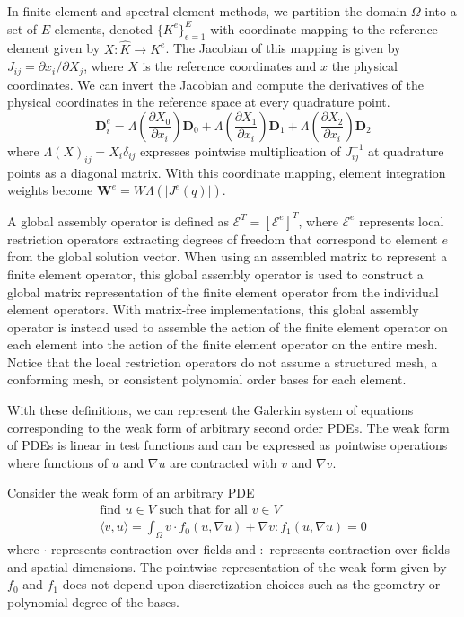 In finite element and spectral element methods, we partition the domain $\Omega$ into a set of $E$ elements, denoted $\lbrace K^e \rbrace_{e = 1}^E$ with coordinate mapping to the reference element given by $X : \hat{K} \rightarrow K^e$.
The Jacobian of this mapping is given by $J_{i j} = \partial x_i / \partial X_j$, where $X$ is the reference coordinates and $x$ the physical coordinates.
We can invert the Jacobian and compute the derivatives of the physical coordinates in the reference space at every quadrature point.
\begin{equation}
\mathbf{D}_i^e = \Lambda \left( \frac{\partial X_0}{\partial x_i} \right) \mathbf{D}_0 + \Lambda \left( \frac{\partial X_1}{\partial x_i} \right) \mathbf{D}_1 + \Lambda \left( \frac{\partial X_2}{\partial x_i} \right) \mathbf{D}_2
\end{equation}
where $\Lambda \left( X \right)_{i j} = X_i \delta_{i j}$ expresses pointwise multiplication of $J_{i j}^{-1}$ at quadrature points as a diagonal matrix.
With this coordinate mapping, element integration weights become $\mathbf{W}^e = W \Lambda \left( \lvert J^e \left( q \right) \rvert \right)$.

A global assembly operator is defined as $\mathcal{E}^T = \left[ \mathcal{E}^e \right]^T$, where $\mathcal{E}^e$ represents local restriction operators extracting degrees of freedom that correspond to element $e$ from the global solution vector.
When using an assembled matrix to represent a finite element operator, this global assembly operator is used to construct a global matrix representation of the finite element operator from the individual element operators.
With matrix-free implementations, this global assembly operator is instead used to assemble the action of the finite element operator on each element into the action of the finite element operator on the entire mesh.
Notice that the local restriction operators do not assume a structured mesh, a conforming mesh, or consistent polynomial order bases for each element.

With these definitions, we can represent the Galerkin system of equations corresponding to the weak form of arbitrary second order PDEs.
The weak form of PDEs is linear in test functions and can be expressed as pointwise operations where functions of $u$ and $\nabla u$ are contracted with $v$ and $\nabla v$.

Consider the weak form of an arbitrary PDE
\begin{equation}
\begin{array}{c}
\text{find } u \in V \text{ such that for all } v \in V\\
\langle v, u \rangle = \int_{\Omega} v \cdot f_0 \left( u, \nabla u \right) + \nabla v : f_1 \left( u, \nabla u \right) = 0
\end{array}
\label{weak_form}
\end{equation}
where $\cdot$ represents contraction over fields and $:$ represents contraction over fields and spatial dimensions.
The pointwise representation of the weak form given by $f_0$ and $f_1$ does not depend upon discretization choices such as the geometry or polynomial degree of the bases.


